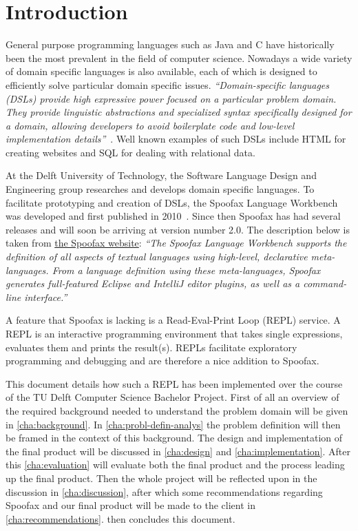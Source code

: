 \chapter{Introduction}
\label{cha:introduction}

General purpose programming languages such as Java and C have historically been
the most prevalent in the field of computer science. Nowadays a wide variety of
domain specific languages is also available, each of which is designed to
efficiently solve particular domain specific issues. \textit{``Domain-specific
languages (DSLs) provide high expressive power focused on a particular problem
domain. They provide linguistic abstractions and specialized syntax
specifically designed for a domain, allowing developers to avoid boilerplate
code and low-level implementation details''}~\cite{Kats10a}. Well known
examples of such DSLs include HTML for creating websites and SQL for dealing
with relational data.

At the Delft University of Technology, the Software Language Design and
Engineering group researches and develops domain specific languages. To
facilitate prototyping and creation of DSLs, the Spoofax Language Workbench was
developed and first published in 2010~\cite{Kats10a}. Since then Spoofax has had
several releases and will soon be arriving at version number 2.0. The
description below is taken from \href{http://spoofax.org}{the Spoofax website}:
\textit{``The Spoofax Language Workbench supports the definition of all aspects
of textual languages using high-level, declarative meta-languages. From a
language definition using these meta-languages, Spoofax generates full-featured
Eclipse and IntelliJ editor plugins, as well as a command-line interface.''}

A feature that Spoofax is lacking is a Read-Eval-Print Loop (REPL) service. A
REPL is an interactive programming environment that takes single expressions,
evaluates them and prints the result(s). REPLs facilitate exploratory
programming and debugging and are therefore a nice addition to Spoofax.

This document details how such a REPL has been implemented over the course of
the TU Delft Computer Science Bachelor Project. First of all an overview of the
required background needed to understand the problem domain will be given in
\cref{cha:background}. In \cref{cha:probl-defin-analys} the problem definition
will then be framed in the context of this background. The design and
implementation of the final product will be discussed in \cref{cha:design} and
\cref{cha:implementation}. After this \cref{cha:evaluation} will evaluate both
the final product and the process leading up the final product. Then the whole
project will be reflected upon in the discussion in \cref{cha:discussion},
after which some recommendations regarding Spoofax and our final product will
be made to the client in \cref{cha:recommendations}.  then
concludes this document.

